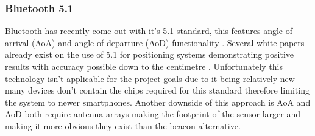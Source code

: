 \subsubsection{Bluetooth 5.1}
Bluetooth has recently come out with it’s 5.1 standard, this features angle of arrival (AoA) and angle of departure (AoD) functionality \citetemp. Several white papers already exist on the use of 5.1 for positioning systems demonstrating positive results with accuracy possible down to the centimetre \citetemp. Unfortunately this technology isn't applicable for the project goals due to it being relatively new many devices don't contain the chips required for this standard \citetemp therefore limiting the system to newer smartphones. Another downside of this approach is AoA and AoD both require antenna arrays making the footprint of the sensor larger and making it more obvious they exist than the beacon alternative.